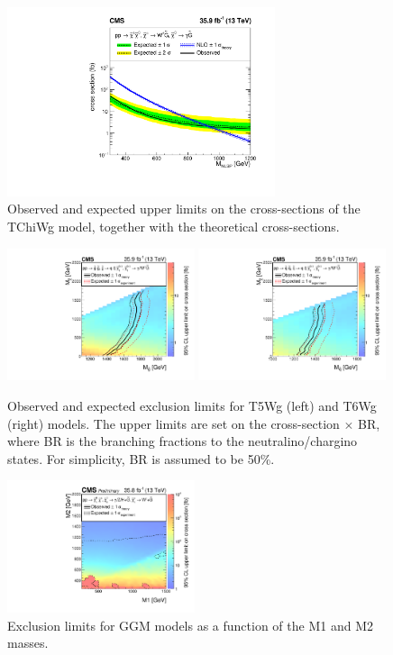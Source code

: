\documentclass[thesis.tex]{subfiles}
\renewcommand\_{\textunderscore\allowbreak}
\begin{document}
\begin{figure}
  \centering
    \includegraphics[width=0.7\textwidth]{Fig/Figure_006.pdf}
		\caption{Observed and expected upper limits on the cross-sections of the TChiWg model, together with the theoretical cross-sections. }
    \label{fig:tchiwglimit}
\end{figure}

\begin{figure}
  \centering
    \includegraphics[width=0.49\textwidth]{Fig/Figure_007-a.pdf}
    \includegraphics[width=0.49\textwidth]{Fig/Figure_007-b.pdf}
		\caption{Observed and expected exclusion limits for T5Wg (left) and T6Wg (right) models. The upper limits are set on the cross-section $\times$ BR, where BR is the branching fractions to the neutralino/chargino states. For simplicity, BR is assumed to be 50\%. }
    \label{fig:t5wglimit}
\end{figure}

\begin{figure}
  \centering
    \includegraphics[width=0.49\textwidth]{Fig/GGMXSEC.pdf}
    \caption{Exclusion limits for GGM models as a function of the M1 and M2 masses.}
     \label{fig:M1M2limit}
\end{figure}
\end{document}
